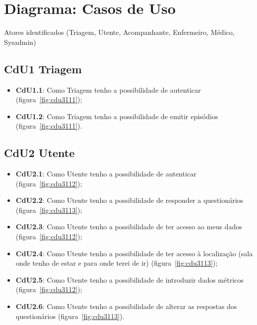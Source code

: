 
\section{Diagrama: Casos de Uso}

Atores identificados (Triagem, Utente, Acompanhante, Enfermeiro, Médico, Sysadmin)
\newline

\subsection{CdU1 Triagem}

\begin{minipage}{\linewidth}
\begin{itemize}
	\item \textbf{CdU1.1}: Como Triagem tenho a possibilidade de autenticar (figura~\ref{fig:cdu3111});
	\item \textbf{CdU1.2}: Como Triagem tenho a possibilidade de emitir episódios (figura~\ref{fig:cdu3111}).
\end{itemize}
\end{minipage}
\newline
  
\subsection{CdU2 Utente}

\begin{minipage}{\linewidth}
\begin{itemize}
	\item \textbf{CdU2.1}: Como Utente tenho a possibilidade de autenticar (figura~\ref{fig:cdu3112});
	\item \textbf{CdU2.2}: Como Utente tenho a possibilidade de responder a questionários (figura~\ref{fig:cdu3113});
	\item \textbf{CdU2.3}: Como Utente tenho a possibilidade de ter acesso ao meus dados (figura~\ref{fig:cdu3112});
	\item \textbf{CdU2.4}: Como Utente tenho a possibilidade de ter acesso à localização (sala onde tenho de estar e para onde terei de ir) (figura~\ref{fig:cdu3113});
	\item \textbf{CdU2.5}: Como Utente tenho a possibilidade de introduzir dados métricos (figura~\ref{fig:cdu3112});
	\item \textbf{CdU2.6}: Como Utente tenho a possibilidade de alterar as respostas dos questionários (figura~\ref{fig:cdu3113}).
\end{itemize}
\end{minipage}
\newline

